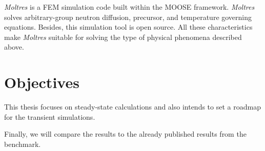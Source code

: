 \documentclass[11pt,letterpaper]{article}
\begin{document}
\textit{Moltres} \cite{lindsay_introduction_2018} is a \gls{FEM} simulation code built within the \gls{MOOSE} framework.
\textit{Moltres} solves arbitrary-group neutron diffusion, precursor, and temperature governing equations.
Besides, this simulation tool is open source.
All these characteristics make \textit{Moltres} suitable for solving the type of physical phenomena described above.

\section{Objectives}

This thesis focuses on steady-state calculations and also intends to set a roadmap for the transient simulations.

Finally, we will compare the results to the already published results from the benchmark.

\pagebreak


\end{document}
